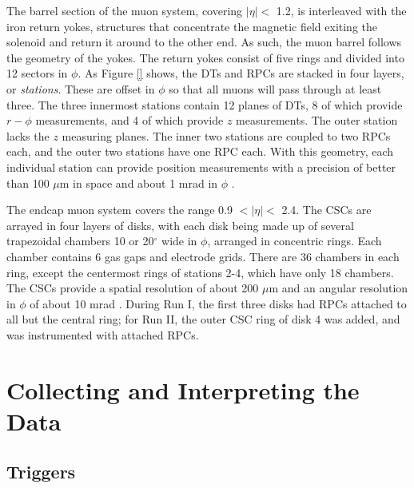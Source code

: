 The barrel section of the muon system, covering $|\eta| <$ 1.2, is
interleaved with the iron return yokes, structures that concentrate
the magnetic field exiting the solenoid and return it around to the
other end. As such, the muon barrel follows the geometry of the
yokes. The return yokes consist of five rings %
and divided into 12 sectors in $\phi$. As Figure \ref{} shows,
the DTs and RPCs are stacked in four layers, or \emph{stations}. These
are offset in $\phi$ so that all muons will pass through at least
three. The three innermost stations contain 12 planes of DTs, 8 of
which provide $r-\phi$ measurements, and 4 of which provide $z$
measurements. The outer station lacks the $z$ measuring planes. The
inner two stations are coupled to two RPCs each, and the outer two
stations have one RPC each. With this geometry, each individual
station can provide position measurements with a precision of better
than 100 $\mu$m in space and about 1 mrad in $\phi$ \cite{tdr}.

The endcap muon system covers the range 0.9 $< |\eta| <$ 2.4. The
CSCs are arrayed in four layers of disks, with each disk being made up
of several trapezoidal chambers 10 or 20$^\circ$ wide in $\phi$,
arranged in concentric rings. Each chamber contains 6 gas gaps and
electrode grids. There are 36 chambers in each ring, except the
centermost rings of stations 2-4, which have only 18 chambers. The
CSCs provide a spatial resolution of about 200 $\mu$m and an angular
resolution in $\phi$ of about 10 mrad \cite{tdr}. During Run I, the
first three disks had RPCs attached to all but the central ring; for
Run II, the outer CSC ring of disk 4 was added, and was instrumented
with attached RPCs.


\section{Collecting and Interpreting the Data}
\label{sec:cms:datacollectinterp}

\subsection{Triggers} %
\label{ssec:cms:triggers}

%
%

